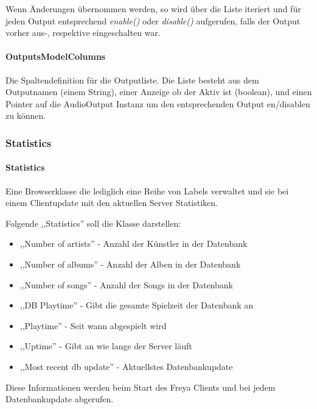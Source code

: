 Wenn Änderungen übernommen werden, so wird über die Liste iteriert und für jeden Output entsprechend \emph{enable()} oder \emph{disable()} aufgerufen, 
falls der Output vorher aus-, respektive eingeschalten war.

\paragraph{OutputsModelColumns}
Die Spaltendefinition für die Outputliste.
Die Liste besteht aus dem Outputnamen (einem String), einer Anzeige ob der Aktiv ist (boolean),
und einen Pointer auf die AudioOutput Instanz um den entsprechenden Output en/disablen zu können.

\subsubsection{Statistics}
\paragraph{Statistics}
Eine Browserklasse die lediglich eine Reihe von Labels verwaltet und sie bei einem Clientupdate mit den aktuellen Server Statistiken.

Folgende ,,Statistics'' soll die Klasse darstellen:
\begin{itemize}
\item ,,Number of artists'' - Anzahl der Künstler in der Datenbank
\item ,,Number of albums'' - Anzahl der Alben in der Datenbank
\item ,,Number of songs'' - Anzahl der Songs in der Datenbank
\item ,,DB Playtime'' - Gibt die gesamte Spielzeit der Datenbank an
\item ,,Playtime'' - Seit wann abgespielt wird
\item ,,Uptime'' - Gibt an wie lange der Server läuft
\item ,,Most recent db update'' - Aktuellstes Datenbankupdate
\end{itemize}

Diese Informationen werden beim Start des Freya Clients und bei jedem Datenbankupdate abgerufen.
